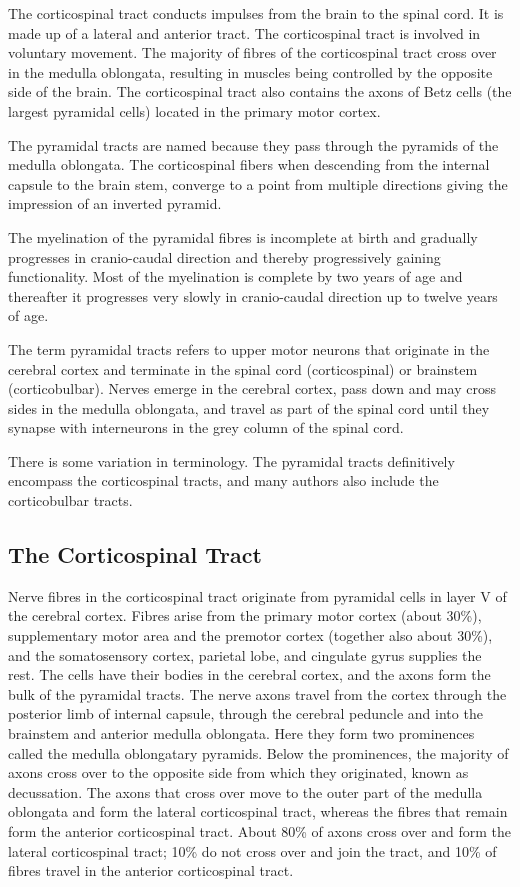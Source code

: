 \documentclass[]{book}
\begin{document}
The corticospinal tract conducts impulses from the brain to the spinal cord. It is made up of a lateral and anterior tract. The corticospinal tract is involved in voluntary movement. The majority of fibres of the corticospinal tract cross over in the medulla oblongata, resulting in muscles being controlled by the opposite side of the brain. The corticospinal tract also contains the axons of Betz cells (the largest pyramidal cells) located in the primary motor cortex.

The pyramidal tracts are named because they pass through the pyramids of the medulla oblongata. The corticospinal fibers when descending from the internal capsule to the brain stem, converge to a point from multiple directions giving the impression of an inverted pyramid.

The myelination of the pyramidal fibres is incomplete at birth and gradually progresses in cranio-caudal direction and thereby progressively gaining functionality. Most of the myelination is complete by two years of age and thereafter it progresses very slowly in cranio-caudal direction up to twelve years of age.

The term pyramidal tracts refers to upper motor neurons that originate in the cerebral cortex and terminate in the spinal cord (corticospinal) or brainstem (corticobulbar). Nerves emerge in the cerebral cortex, pass down and may cross sides in the medulla oblongata, and travel as part of the spinal cord until they synapse with interneurons in the grey column of the spinal cord.

There is some variation in terminology. The pyramidal tracts definitively encompass the corticospinal tracts, and many authors also include the corticobulbar tracts.

\hypertarget{the-corticospinal-tract-1}{%
\subsection{The Corticospinal Tract}\label{the-corticospinal-tract-1}}

Nerve fibres in the corticospinal tract originate from pyramidal cells in layer V of the cerebral cortex. Fibres arise from the primary motor cortex (about 30\%), supplementary motor area and the premotor cortex (together also about 30\%), and the somatosensory cortex, parietal lobe, and cingulate gyrus supplies the rest. The cells have their bodies in the cerebral cortex, and the axons form the bulk of the pyramidal tracts. The nerve axons travel from the cortex through the posterior limb of internal capsule, through the cerebral peduncle and into the brainstem and anterior medulla oblongata. Here they form two prominences called the medulla oblongatary pyramids. Below the prominences, the majority of axons cross over to the opposite side from which they originated, known as decussation. The axons that cross over move to the outer part of the medulla oblongata and form the lateral corticospinal tract, whereas the fibres that remain form the anterior corticospinal tract. About 80\% of axons cross over and form the lateral corticospinal tract; 10\% do not cross over and join the tract, and 10\% of fibres travel in the anterior corticospinal tract.
\end{document}
